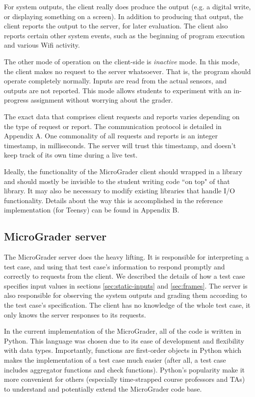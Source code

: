 \documentclass[12pt]{article}
\begin{document}
For system outputs, the client really does produce the output (e.g. a digital write, or displaying something on a screen).  In addition to producing that output, the client reports the output to the server, for later evaluation.  The client also reports certain other system events, such as the beginning of program execution and various Wifi activity.

The other mode of operation on the client-side is \textit{inactive} mode.  In this mode, the client makes no request to the server whatsoever.  That is, the program should operate completely normally.  Inputs are read from the actual sensors, and outputs are not reported.  This mode allows students to experiment with an in-progress assignment without worrying about the grader.

The exact data that comprises client requests and reports varies depending on the type of request or report.  The communication protocol is detailed in Appendix A.  One commonality of all requests and reports is an integer timestamp, in milliseconds.  The server will trust this timestamp, and doesn't keep track of its own time during a live test.

Ideally, the functionality of the MicroGrader client should wrapped in a library and should mostly be invisible to the student writing code ``on top" of that library.  It may also be necessary to modify existing libraries that handle I/O functionality.  Details about the way this is accomplished in the reference implementation (for Teensy) can be found in Appendix B.

\subsection{MicroGrader server}
The MicroGrader server does the heavy lifting.  It is responsible for interpreting a test case, and using that test case's information to respond promptly and correctly to requests from the client.  We described the details of how a test case specifies input values in sections \ref{sec:static-inputs} and \ref{sec:frames}.  The server is also responsible for observing the system outputs and grading them according to the test case's specification.  The client has no knowledge of the whole test case, it only knows the server responses to its requests.

In the current implementation of the MicroGrader, all of the code is written in Python.  This language was chosen due to its ease of development and flexibility with data types.  Importantly, functions are first-order objects in Python which makes the implementation of a test case much easier (after all, a test case includes aggregator functions and check functions).  Python's popularity make it more convenient for others (especially time-strapped course professors and TAs) to understand and potentially extend the MicroGrader code base.
\end{document}
